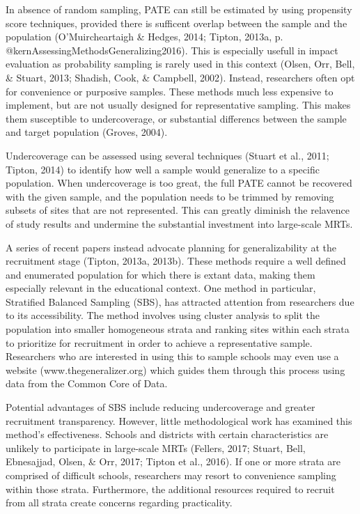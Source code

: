 \documentclass[man,floatsintext]{apa6}
\begin{document}
In absence of random sampling, PATE can still be estimated by using propensity score techniques, provided there is sufficent overlap between the sample and the population (O'Muircheartaigh \& Hedges, 2014; Tipton, 2013a, p. @kernAssessingMethodsGeneralizing2016). This is especially usefull in impact evaluation as probability sampling is rarely used in this context (Olsen, Orr, Bell, \& Stuart, 2013; Shadish, Cook, \& Campbell, 2002). Instead, researchers often opt for convenience or purposive samples. These methods much less expensive to implement, but are not usually designed for representative sampling. This makes them susceptible to undercoverage, or substantial differencs between the sample and target population (Groves, 2004).

Undercoverage can be assessed using several techniques (Stuart et al., 2011; Tipton, 2014) to identify how well a sample would generalize to a specific population. When undercoverage is too great, the full PATE cannot be recovered with the given sample, and the population needs to be trimmed by removing subsets of sites that are not represented. This can greatly diminish the relavence of study results and undermine the substantial investment into large-scale MRTs.

A series of recent papers instead advocate planning for generalizability at the recruitment stage (Tipton, 2013a, 2013b). These methods require a well defined and enumerated population for which there is extant data, making them especially relevant in the educational context. One method in particular, Stratified Balanced Sampling (SBS), has attracted attention from researchers due to its accessibility. The method involves using cluster analysis to split the population into smaller homogeneous strata and ranking sites within each strata to prioritize for recruitment in order to achieve a representative sample. Researchers who are interested in using this to sample schools may even use a website (www.thegeneralizer.org) which guides them through this process using data from the Common Core of Data.

Potential advantages of SBS include reducing undercoverage and greater recruitment transparency. However, little methodological work has examined this method's effectiveness. Schools and districts with certain characteristics are unlikely to participate in large-scale MRTs (Fellers, 2017; Stuart, Bell, Ebnesajjad, Olsen, \& Orr, 2017; Tipton et al., 2016). If one or more strata are comprised of difficult schools, researchers may resort to convenience sampling within those strata. Furthermore, the additional resources required to recruit from all strata create concerns regarding practicality.
\end{document}
